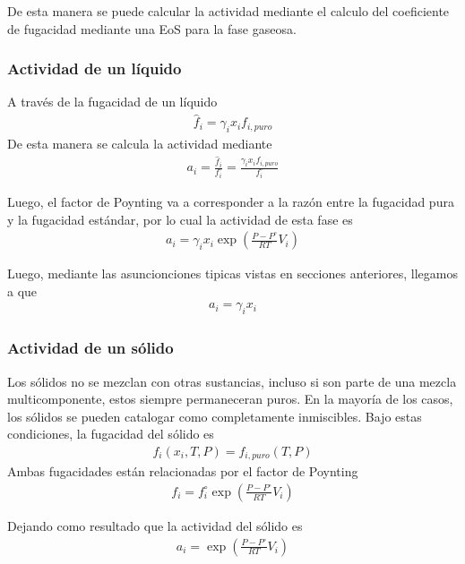 De esta manera se puede calcular la actividad mediante el calculo del coeficiente de fugacidad mediante una EoS para la fase gaseosa.
\subsubsection{Actividad de un líquido}

A través de la fugacidad de un líquido
\begin{align}
    \hat{f}_i=\gamma_i x_i f_{i,puro}
\end{align}
De esta manera se calcula la actividad mediante
\begin{align}
    a_i=\frac{\hat{f}_i}{f_i^\circ}=\frac{\gamma_ix_if_{i,puro}}{f_i^\circ}
\end{align}

Luego, el factor de Poynting va a corresponder a la razón entre la fugacidad pura y la fugacidad estándar, por lo cual la actividad de esta fase es
\begin{align}
    a_i=\gamma_ix_i\exp\left(\frac{P-P^\circ}{RT}V_i\right)
\end{align}

Luego, mediante las asuncionciones tipicas vistas en secciones anteriores, llegamos a que 
\begin{align}
    a_i=\gamma_ix_i
\end{align}

\subsubsection{Actividad de un sólido}

Los sólidos no se mezclan con otras sustancias, incluso si son parte de una mezcla multicomponente, estos siempre permaneceran puros. En la mayoría de los casos, los sólidos se pueden catalogar como completamente inmiscibles. Bajo estas condiciones, la fugacidad del sólido es
\begin{align}
    f_i(x_i,T,P)=f_{i,puro}(T,P)
\end{align}
Ambas fugacidades están relacionadas por el factor de Poynting
\begin{align}
    f_i=f_i^\circ \exp\left( \frac{P-P^\circ}{RT}V_i \right)
\end{align}

Dejando como resultado que la actividad del sólido es 
\begin{align}
    a_i=\exp\left( \frac{P-P^\circ}{RT}V_i \right)
\end{align}

